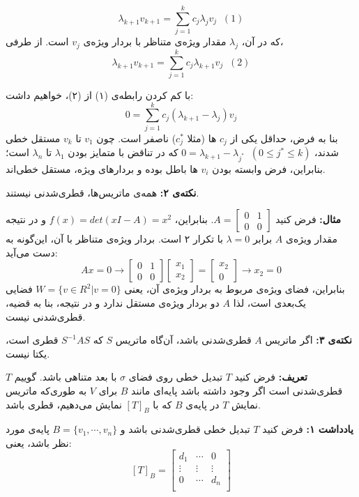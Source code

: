 $$ \lambda_{k+1} v_{k+1} = \sum_{j=1}^k c_j \lambda_j v_j \; \; (1)$$
که در آن،
$\lambda_j$
مقدار ویژه‌ی متناظر با بردار ویژه‌ی $v_j$ است. از طرفی،
$$ \lambda_{k+1} v_{k+1} = \sum_{j=1}^k c_j \lambda_{k+1} v_j \; \; (2)$$

با کم کردن رابطه‌ی (۱) از (۲)، خواهیم داشت:
$$ 0 = \sum_{j=1}^k c_j (\lambda_{k+1}-\lambda_{j}) v_j$$
بنا به فرض، حداقل یکی از $c_j$ ها (مثلا $c_j^*$) ناصفر است. چون $v_1$ تا $v_k$ مستقل خطی شدند،
$0=\lambda_{k+1}-\lambda_{j^*} \; \; (0 \leq j^* \leq k)$
که در تناقض با متمایز بودن $\lambda_1$ تا $\lambda_n$ است؛ بنابراین، فرض وابسته بودن $v_i$ ها باطل بوده و بردارهای ویژه، مستقل خطی‌اند.

\textbf{نکته‌ی ۲: }
همه‌ی ماتریس‌ها، قطری‌شدنی نیستند.

\textbf{مثال: }
فرض کنید
$A=\begin{bmatrix}
0 & 1 \\
0 & 0
\end{bmatrix}$.
بنابراین،
$f(x)=det(xI-A)=x^2$
و در نتیجه مقدار ویژه‌ی $A$ برابر $\lambda = 0$ با تکرار ۲ است. بردار ویژه‌ی متناظر با آن، این‌گونه به دست می‌آید:
$$ Ax = 0 \to \begin{bmatrix}
0 & 1 \\
0 & 0
\end{bmatrix} \begin{bmatrix}
x_1 \\
x_2
\end{bmatrix}=\begin{bmatrix}
x_2 \\
0
\end{bmatrix} \to x_2=0 $$
بنابراین، فضای ویژه‌ی مربوط به بردار ویژه‌ی آن، یعنی
$W=\{v \in R^2 | v=0\}$
فضایی یک‌بعدی است، لذا $A$ دو بردار ویژه‌ی مستقل ندارد و در نتیجه، بنا به قضیه، قطری‌شدنی نیست.

\textbf{نکته‌ی ۳: }
اگر ماتریس $A$ قطری‌شدنی باشد، آن‌گاه ماتریس $S$ که $S^{-1}AS$ قطری است، یکتا نیست.

\textbf{تعریف: }
فرض کنید $T$ تبدیل خطی روی فضای $\sigma$ با بعد متناهی باشد. گوییم $T$ قطری‌شدنی است اگر وجود داشته باشد پایه‌ای مانند $‌B$ برای $V$ به طوری‌که ماتریس نمایش $T$ در پایه‌ی $B$ که با $[T]_B$ نمایش می‌دهیم، قطری باشد.

\textbf{یادداشت ۱: }
فرض کنید $T$ تبدیل خطی قطری‌شدنی باشد و
$B=\{v_1,\cdots,v_n\}$
پایه‌ی مورد نظر باشد، یعنی:
$$[T]_B = \begin{bmatrix}
d_1 & \cdots & 0 \\
\vdots & \vdots & \vdots \\
0 & \cdots & d_n \\
\end{bmatrix}$$

